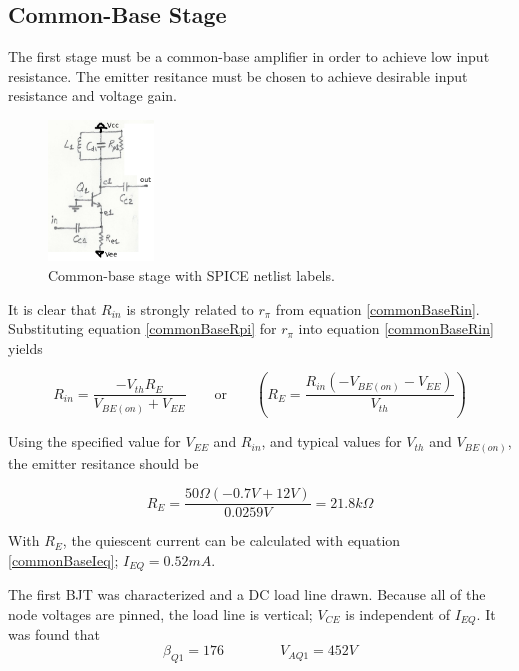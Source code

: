 \documentclass[titlepage, letterpaper, 11pt]{article}
\begin{document}
\subsection{Common-Base Stage}

The first stage must be a common-base amplifier in order to achieve
low input resistance. The emitter resitance must be
chosen to achieve desirable input resistance and voltage gain.

\begin{figure}[ht]
	\centering
	\includegraphics[width=0.25\textwidth]
		{figures/commonBaseStage}
	\caption{
		Common-base stage with SPICE netlist labels.
	}
	\label{commonBaseStage}
\end{figure}


It is clear that $R_{in}$ is strongly related to $r_{\pi}$ from
equation \ref{commonBaseRin}. Substituting equation
\ref{commonBaseRpi} for $r_{\pi}$ into equation \ref{commonBaseRin}
yields

\begin{equation*}
R_{in}=\frac{-V_{th}R_{E}}{V_{BE(on)}+V_{EE}}
\qquad\textrm{or}\qquad
\left(R_{E}=\frac{R_{in}(-V_{BE(on)}-V_{EE})}{V_{th}}\right)
\end{equation*}

Using the specified value for $V_{EE}$ and $R_{in}$, and typical
values for $V_{th}$ and $V_{BE(on)}$, the emitter resitance should be

\begin{equation*}
R_{E}=\frac{50\Omega(-0.7V+12V)}{0.0259V}=21.8k\Omega
\end{equation*}

With $R_{E}$, the quiescent current can be calculated with equation
\ref{commonBaseIeq}; $I_{EQ}=0.52mA$.

The first BJT was characterized and a DC load line drawn. Because all
of the node voltages are pinned, the load line is vertical; $V_{CE}$
is independent of $I_{EQ}$. It was found that
\begin{equation*}
\beta_{Q1}=176\qquad\qquad V_{AQ1}=452V
\end{equation*}
\end{document}
